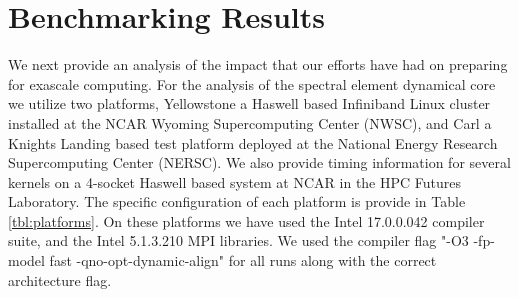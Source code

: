 \section{Benchmarking Results}\label{sec:bench}

  We next provide an analysis of the impact that our efforts have had on preparing for exascale computing.  For the analysis of the spectral element dynamical core we utilize two platforms, Yellowstone a Haswell based Infiniband Linux cluster installed at the NCAR Wyoming Supercomputing Center (NWSC), and Carl a Knights Landing based test platform deployed at the National Energy Research Supercomputing Center (NERSC).  We also provide timing information for several kernels on a 4-socket Haswell based system at NCAR in the HPC Futures Laboratory.  The specific configuration of each platform is provide in Table \ref{tbl:platforms}.  On these platforms we have used the Intel 17.0.0.042 compiler suite, and the Intel 5.1.3.210 MPI libraries.  We used the compiler flag "-O3 -fp-model fast -qno-opt-dynamic-align" for all runs along with the correct architecture flag.  
  

  
  
%

%

%